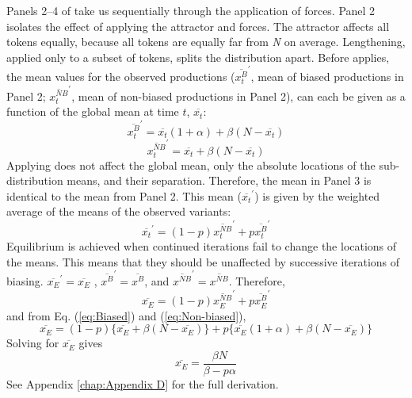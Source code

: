Panels 2--4 of  take us sequentially through
the application of forces. Panel 2 isolates the effect of applying
the attractor and  forces. The attractor affects all tokens
equally, because all tokens are equally far from \emph{N} on average.
Lengthening, applied only to a subset of tokens, splits the distribution
apart. Before  applies, the mean values for the observed
productions ($\overline{x_{t}^{B}}^{\prime}$, mean of biased productions
in Panel 2; $\overline{x_{t}^{NB}}^{\prime}$, mean of non-biased productions
in Panel 2), can each be given as a function of the global mean at
time $t$, $\overline{x_{t}}$:
\begin{equation}
\overline{x_{t}^{B}}^{\prime}=\overline{x_{t}}(1+\alpha)+\beta(N-\overline{x_{t}})\label{eq:Biased}
\end{equation}
\begin{equation}
\overline{x_{t}^{NB}}^{\prime}=\overline{x_{t}}+\beta(N-\overline{x_{t}})\label{eq:Non-biased}
\end{equation}
Applying  does not affect the global mean, only the absolute
locations of the sub-distribution means, and their separation. Therefore,
the mean in Panel 3 is identical to the mean from Panel 2. This mean
($\overline{x_{t}}^{\prime}$) is given by the weighted average of the
means of the observed  variants: 
\begin{equation}
\overline{x_{t}}^{\prime}=(1-p)\overline{x_{t}^{NB}}^{\prime}+p\overline{x_{t}^{B}}^{\prime}\label{eq: G weighted mean}
\end{equation}
Equilibrium is achieved when continued iterations fail to change the
locations of the means. This means that they should be unaffected
by successive iterations of biasing. $\overline{x_{E}}^{\prime}=\overline{x_{E}}$
, $\overline{x^{B}}^{\prime}=\overline{x^{B}}$, and $\overline{x^{NB}}^{\prime}=\overline{x^{NB}}$.
Therefore,\pagebreak
\begin{equation}
\overline{x_{E}}=(1-p)\overline{x_{E}^{NB}}^{\prime}+p\overline{x_{E}^{B}}^{\prime}\label{eq:equilbrium 1}
\end{equation}
and from Eq. (\ref{eq:Biased}) and (\ref{eq:Non-biased}), 
\begin{equation}
\overline{x_{E}}=(1-p)\{\overline{x_{E}}+\beta(N-\overline{x_{E}})\}+p\{\overline{x_{E}}(1+\alpha)+\beta(N-\overline{x_{E}})\}\label{eq:equilbrium 2}
\end{equation}
Solving for $\overline{x_{E}}$ gives
\begin{equation}
\overline{x_{E}}=\frac{\beta N}{\beta-p\alpha}\label{eq: lengthening process}
\end{equation}
See Appendix \ref{chap:Appendix D} for the full derivation.

